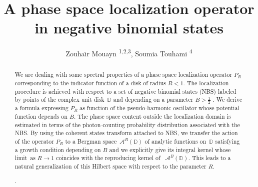 

\title[A phase space localization operator in negative binomial states]{
A phase space localization operator in negative binomial states}


\author[Zouha\"{\i}r Mouayn, Soumia Touhami ]{
 Zouha\"{\i}r Mouayn \textsuperscript{1,2,3}, Soumia Touhami \textsuperscript{4}}


\address{\footnotesize \textsuperscript{1} Department of Mathematics, Faculty of Sciences and
Technics (M'Ghila), {\scriptsize Sultan Moulay Slimane University, B\'{e}ni Mellal, Morocco.}}
\address{\footnotesize \textsuperscript{2} Institut des Hautes Études Scientifiques, Paris Saclay University
Le Bois-Marie, {\scriptsize 35 route de Chartres  CS 40001 91893 Bures-sur-Yvette, France.}}
\address{\footnotesize \textsuperscript{3} Institut Henri Poincaré - UAR 839 Sorbonne University, / CNRS, {\scriptsize 11 rue Pierre et Marie Curie
75231 Paris Cedex 05 France.}}
\address{\footnotesize \textsuperscript{4} Department of Mathematics, KTH Royal Institute
of Technology, {\scriptsize Stockholm, Sweden.}}




\maketitle




\begin{abstract}
We are dealing with some spectral properties of a phase space localization
operator $P_{R}$ corresponding to the indicator function of a disk of radius 
$R<1.$ The localization procedure is achieved with respect to a set of
negative binomial states (NBS) labeled by points of the complex unit disk\ $%
\mathbb{D}$ and depending on a parameter $B>%
{\frac12}%
$ $.$ We derive a formula expressing $P_{R}$ as function of the
pseudo-harmonic oscillator whose potential function depends on $B$. The
phase space content outside the localization domain is estimated in terms of
the photon-counting probability distribution associated with the NBS. By
using the coherent states transform attached to NBS, we transfer the action
of the operator $P_{R}$ to a Bergman space\ $\mathcal{A}^{B}\left( \mathbb{D}%
\right) $ of analytic functions on\ $\mathbb{D}$ satisfying a growth
condition depending on $B$ and we explicitly give its integral kernel whose
limit\ as $R\rightarrow 1$ coincides with the reproducing kernel of \ $%
\mathcal{A}^{B}\left( \mathbb{D}\right) $. This leads to a natural
generalization of this Hilbert space with respect to the parameter $R$.

.
\end{abstract}



